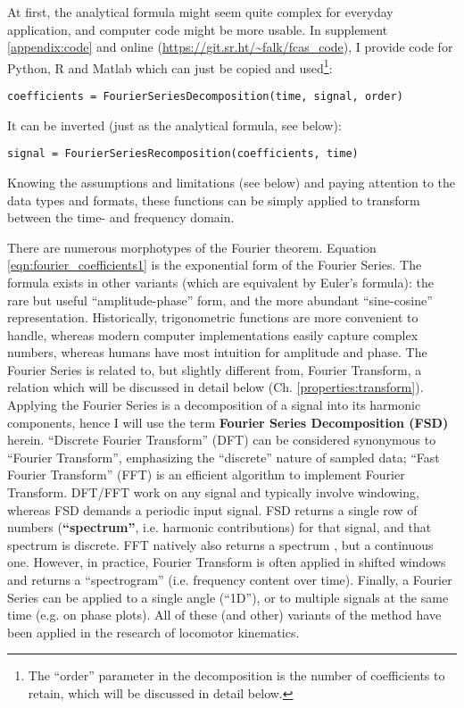 At first, the analytical formula might seem quite complex for everyday application, and computer code might be more usable.
In supplement \ref{appendix:code} and online (\url{https://git.sr.ht/~falk/fcas_code}), I provide code for Python, R and Matlab which can just be copied and used\footnote{The ``order'' parameter in the decomposition is the number of coefficients to retain, which will be discussed in detail below.}:
\begin{lstlisting}
coefficients = FourierSeriesDecomposition(time, signal, order)
\end{lstlisting}

It can be inverted (just as the analytical formula, see below):
\begin{lstlisting}
signal = FourierSeriesRecomposition(coefficients, time)
\end{lstlisting}

Knowing the assumptions and limitations (see below) and paying attention to the data types and formats, these functions can be simply applied to transform between the time- and frequency domain.


\bigskip
There are numerous morphotypes of the Fourier theorem.
Equation \eqref{eqn:fourier_coefficients1} is the exponential form of the Fourier Series.
The formula exists in other variants (which are equivalent by Euler's formula): the rare but useful ``amplitude-phase'' form, and the more abundant ``sine-cosine'' representation.
Historically, trigonometric functions are more convenient to handle, whereas modern computer implementations easily capture complex numbers, whereas humans have most intuition for amplitude and phase.
The Fourier Series is related to, but slightly different from, Fourier Transform, a relation which will be discussed in detail below (Ch. \ref{properties:transform}).
Applying the Fourier Series is a decomposition of a signal into its harmonic components, hence I will use the term \textbf{Fourier Series Decomposition (FSD)} herein.
``Discrete Fourier Transform'' (DFT) can be considered synonymous to ``Fourier Transform'', emphasizing the ``discrete'' nature of sampled data; ``Fast Fourier Transform'' (FFT) is an efficient algorithm to implement Fourier Transform.
DFT/FFT work on any signal and typically involve windowing, whereas FSD demands a periodic input signal.
FSD returns a single row of numbers (\textbf{``spectrum''}, i.e. harmonic contributions) for that signal, and that spectrum is discrete.
FFT natively also returns a spectrum \citep{Welch1967}, but a continuous one.
However, in practice, Fourier Transform is often applied in shifted windows and returns a ``spectrogram'' (i.e. frequency content over time).
Finally, a Fourier Series can be applied to a single angle (``1D''), or to multiple signals at the same time (e.g. on phase plots).
All of these (and other) variants of the method have been applied in the research of locomotor kinematics.

